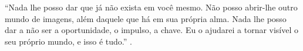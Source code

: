 \begin{epigrafe}%
    ``Nada lhe posso dar que já não exista em você mesmo. Não posso abrir-lhe outro mundo de imagens, além daquele que há em sua própria alma. Nada lhe posso dar a não ser a oportunidade, o impulso, a chave. Eu o ajudarei a tornar visível o seu próprio mundo, e isso é tudo.'' \cite{hesse2025}.
\end{epigrafe}

